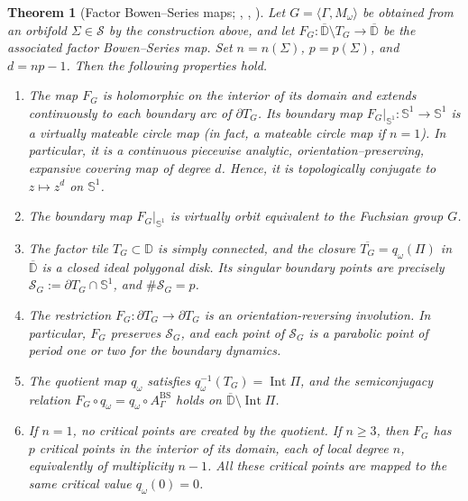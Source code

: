 \documentclass[11pt,a4paper, oneside]{amsart}
\newtheorem{thm}{Theorem}[section]
\theoremstyle{definition}
\theoremstyle{remark}
\numberwithin{equation}{section}
\def\D{{\mathbb{D}}}
\def\Ss{\mathcal{S}}
\renewcommand{\ge}{\geqslant}
\newcommand{\ovl}{\overline}
\newcommand{\disk}{\mathbb{D}}
\newcommand{\Circle}{{{\mathbb S}^1}}
\begin{document}
\begin{thm}[Factor Bowen--Series maps;
	{\cite[Proposition~2.5]{MM},
		\cite[Theorem~2.6]{MM_survey},
		\cite[\S13]{LLM24}}]
	\label{Thm:FBSProperties}
	Let $G=\langle \Gamma,M_\omega\rangle$ be obtained from an orbifold
	$\Sigma\in\mathscr S$ by the construction above, and let
	$F_G:\overline{\D}\setminus T_G\to\overline{\D}$ be the associated factor
	Bowen--Series map.  Set $n=n(\Sigma)$, $p=p(\Sigma)$, and $d=np-1$.
	Then the following properties hold.
	\begin{enumerate}
		\item The map $F_G$ is holomorphic on the interior of its domain and
		extends continuously to each boundary arc of $\partial T_G$.  Its boundary
		map $F_G|_{\Circle}:\Circle\to\Circle$ is a virtually mateable circle map (in fact, a mateable circle map if $n=1$).  In
		particular, it is a continuous piecewise analytic, orientation--preserving, expansive covering map of degree $d$.  Hence, it is topologically
		conjugate to $z\mapsto z^d$ on $\Circle$.
		
		\item The boundary map $F_G|_{\Circle}$ is virtually orbit equivalent to the
		Fuchsian group $G$. 
		
		\item The factor tile $T_G\subset\D$ is simply connected, and
		the closure $\overline{T_G}=q_\omega(\Pi)$ in $\ovl{\disk}$ is a closed ideal
		polygonal disk.  Its singular boundary points are precisely
		$\Ss_G:=\partial T_G\cap\Circle$, and $\#\Ss_G=p$.
		
		\item The restriction $F_G \colon \partial T_G\to\partial T_G$ is an
		orientation-reversing involution.  In particular, $F_G$
		preserves $\Ss_G$, and each point of $\Ss_G$ is a parabolic point of
		period one or two for the boundary dynamics.
		
		\item The quotient map $q_\omega$ satisfies
		$q_\omega^{-1}(T_G)=\operatorname{Int}\Pi$, and the semiconjugacy relation
		$F_G\circ q_\omega=q_\omega\circ A^{\mathrm{BS}}_\Gamma$ holds on
		$\overline{\D}\setminus\operatorname{Int}\Pi$.
 		\item If $n=1$, no critical points are created by the quotient.  If
		$n\ge3$, then $F_G$ has $p$ critical points in the interior of its domain,
		each of local degree $n$, equivalently of multiplicity $n-1$. All these critical points
		are mapped to the same critical value $q_\omega(0)=0$. 
	\end{enumerate}
\end{thm}
\end{document}
